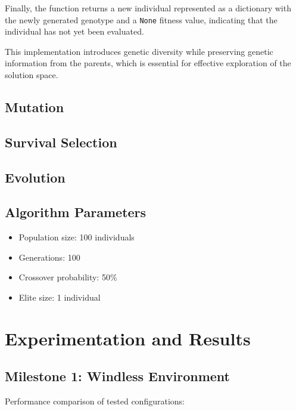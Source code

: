 \documentclass{article}
\begin{document}
Finally, the function returns a new individual represented as a dictionary with the newly generated genotype and a \texttt{None} fitness value, indicating that the individual has not yet been evaluated.

This implementation introduces genetic diversity while preserving genetic information from the parents, which is essential for effective exploration of the solution space.

\subsection{Mutation}
\subsection{Survival Selection}
\subsection{Evolution}

\subsection{Algorithm Parameters}
\begin{itemize}
    \item Population size: 100 individuals
    \item Generations: 100
    \item Crossover probability: 50\%
    \item Elite size: 1 individual
\end{itemize}

\section{Experimentation and Results}
\subsection{Milestone 1: Windless Environment}
Performance comparison of tested configurations:
\end{document}
